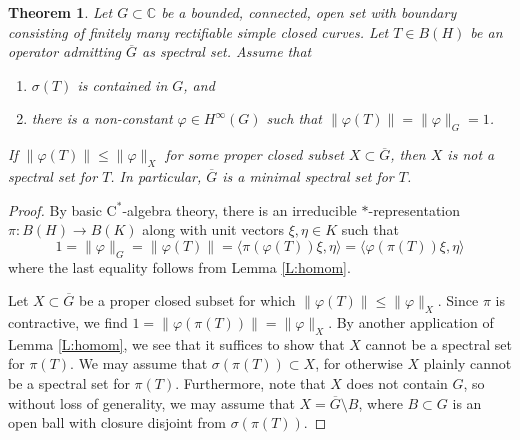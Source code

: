 \documentclass[10pt]{amsart}
\newcommand{\bC}{{\mathbb{C}}}
\newcommand{\rC}{\mathrm{C}}
\renewcommand{\phi}{\varphi}
\newcommand{\ol}{\overline}
\newtheorem{theorem}[lemma]{Theorem}
\theoremstyle{definition}
\begin{document}
\begin{theorem}\label{T:Williams} Let $G\subset \bC$ be a bounded, connected, open set with boundary consisting of finitely many rectifiable simple closed curves. Let $T\in B(H)$ be an operator admitting $\ol{G}$ as spectral set.
Assume that
\begin{enumerate}[{\rm (i)}]
\item $\sigma(T)$ is contained in $G$, and
\item there is a non-constant $\phi\in H^\infty(G)$ such that $\|\phi(T)\|=\|\phi\|_G=1$.
\end{enumerate}
If $\|\phi(T)\|\leq \|\phi\|_X$ for some proper closed subset $X\subset \ol{G}$, then $X$ is not a spectral set for $T$. In particular, $\ol{G}$ is a minimal spectral set for $T$.
\end{theorem}
\begin{proof}
By basic $\rC^*$-algebra theory, there is an irreducible $*$-representation $\pi:B(H)\to B(K)$ along with unit vectors $\xi,\eta\in K$ such that 
\begin{equation}\label{Eq:extphi}
1=\|\phi\|_G=\|\phi(T)\|=\langle \pi(\phi(T))\xi,\eta\rangle=\langle \phi(\pi(T))\xi,\eta\rangle
\end{equation}
where the last equality follows from Lemma \ref{L:homom}. 

Let $X\subset \ol{G}$ be a proper closed subset for which $\|\phi(T)\|\leq \|\phi\|_X$. Since $\pi$ is contractive, we find
$1=\|\phi(\pi(T))\|= \|\phi\|_X$. By another application of Lemma \ref{L:homom}, we see that it suffices to show that $X$ cannot be a  spectral set for $\pi(T)$. We may assume that  $\sigma(\pi(T))\subset X$, for otherwise $X$ plainly cannot be a spectral set for $\pi(T)$. Furthermore, note that $X$ does not contain $G$, so without loss of generality, we may assume that $X=\ol{G}\setminus B$, where $B\subset G$ is an open ball with closure disjoint from $\sigma(\pi(T))$. 




\end{proof}
\end{document}
